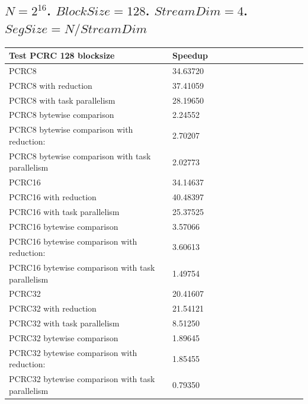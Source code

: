 \documentclass[fleqn]{IEEEtran}
\begin{document}
\subsection{$N=2^{16}$. $BlockSize=128$. $StreamDim=4$. $SegSize=N/StreamDim$}
\begin{footnotesize}
\begin{tabular}{l|l|l|l|l|r|r|r|r|r|r||c|c|}
\toprule
\textbf{Test PCRC 128 blocksize} & \textbf{Speedup} \\
\midrule
PCRC8                                           &	34.63720 \\
PCRC8 with reduction                            &	37.41059 \\
PCRC8 with task parallelism                     &	28.19650 \\
PCRC8 bytewise comparison                       &	2.24552  \\
PCRC8 bytewise comparison with reduction:       &	2.70207  \\
PCRC8 bytewise comparison with task parallelism &	2.02773  \\
PCRC16                                           &	34.14637 \\
PCRC16 with reduction                            &	40.48397 \\
PCRC16 with task parallelism                     &	25.37525 \\
PCRC16 bytewise comparison                       &	3.57066  \\
PCRC16 bytewise comparison with reduction:       &	3.60613  \\
PCRC16 bytewise comparison with task parallelism &	1.49754  \\
PCRC32                                           &	20.41607 \\
PCRC32 with reduction                            &	21.54121 \\
PCRC32 with task parallelism                     &	8.51250  \\
PCRC32 bytewise comparison                       &	1.89645  \\
PCRC32 bytewise comparison with reduction:       &	1.85455  \\
PCRC32 bytewise comparison with task parallelism &	0.79350  \\
\bottomrule
\end{tabular}
\end{footnotesize}
\end{document}
